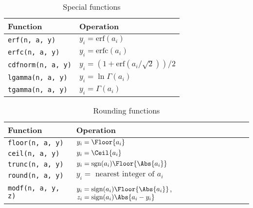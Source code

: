 \begin{table}
  \begin{tabularx}{\textwidth}{LL}
    \toprule
    Function & Operation \\
    \midrule
    \verb|erf(n, a, y)|     & $y_i = \mathrm{erf}(a_i)$                      \\
    \verb|erfc(n, a, y)|    & $y_i = \mathrm{erfc}(a_i)$                     \\
    \verb|cdfnorm(n, a, y)| & $y_i = (1 + \mathrm{erf}(a_i / \sqrt{2})) / 2$ \\
    \verb|lgamma(n, a, y)|  & $y_i = \ln\Gamma(a_i)$                         \\
    \verb|tgamma(n, a, y)|  & $y_i = \Gamma(a_i)$                            \\
    \bottomrule
  \end{tabularx}
  \caption{Special functions}
  \label{tab:Special functions}
\end{table}

\begin{table}
  \begin{tabularx}{\textwidth}{LL}
    \toprule
    Function & Operation \\
    \midrule
    \verb|floor(n, a, y)| & $y_i = \Floor{a_i}$                        \\
    \verb|ceil(n, a, y)|  & $y_i = \Ceil{a_i}$                         \\
    \verb|trunc(n, a, y)| & $y_i = \mathrm{sgn}(a_i)\Floor{\Abs{a_i}}$ \\
    \verb|round(n, a, y)| & $y_i = \text{ nearest integer of }a_i$     \\
    \verb|modf(n, a, y, z)| &
    $y_i = \mathrm{sign}(a_i)\Floor{\Abs{a_i}}$,
    $z_i = \mathrm{sign}(a_i)\Abs{a_i - y_i}$ \\
    \bottomrule
  \end{tabularx}
  \caption{Rounding functions}
  \label{tab:Rounding functions}
\end{table}

\clearpage

